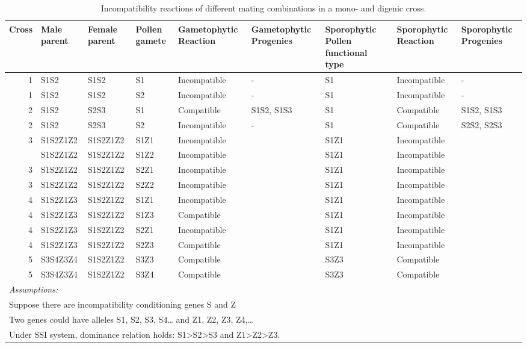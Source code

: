 \documentclass[11pt,ignorenonframetext,aspectratio=169]{beamer}
\begin{document}
\begin{frame}{}
\protect\hypertarget{section-5}{}
\begin{table}

\caption{\label{tab:si-comparison-reaction1}Incompatibility reactions of different mating combinations in a mono- and digenic cross.}
\centering
\fontsize{6}{8}\selectfont
\begin{tabular}[t]{r>{\raggedright\arraybackslash}p{4em}>{\raggedright\arraybackslash}p{4em}>{\raggedright\arraybackslash}p{4em}>{\raggedright\arraybackslash}p{6em}>{\raggedright\arraybackslash}p{8em}>{\raggedright\arraybackslash}p{8em}>{\raggedright\arraybackslash}p{6em}>{\raggedright\arraybackslash}p{8em}}
\toprule
Cross & Male parent & Female parent & Pollen gamete & Gametophytic Reaction & Gametophytic Progenies & Sporophytic Pollen functional type & Sporophytic Reaction & Sporophytic Progenies\\
\midrule
\rowcolor{gray!6}  1 & S1S2 & S1S2 & S1 & Incompatible & - & S1 & Incompatible & -\\
1 & S1S2 & S1S2 & S2 & Incompatible & - & S1 & Incompatible & -\\
\rowcolor{gray!6}  2 & S1S2 & S2S3 & S1 & Compatible & S1S2, S1S3 & S1 & Compatible & S1S2, S1S3\\
2 & S1S2 & S2S3 & S2 & Incompatible & - & S1 & Compatible & S2S2, S2S3\\
\rowcolor{gray!6}  3 & S1S2Z1Z2 & S1S2Z1Z2 & S1Z1 & Incompatible &  & S1Z1 & Incompatible & \\
\addlinespace
3 & S1S2Z1Z2 & S1S2Z1Z2 & S1Z2 & Incompatible &  & S1Z1 & Incompatible & \\
\rowcolor{gray!6}  3 & S1S2Z1Z2 & S1S2Z1Z2 & S2Z1 & Incompatible &  & S1Z1 & Incompatible & \\
3 & S1S2Z1Z2 & S1S2Z1Z2 & S2Z2 & Incompatible &  & S1Z1 & Incompatible & \\
\rowcolor{gray!6}  4 & S1S2Z1Z3 & S1S2Z1Z2 & S1Z1 & Incompatible &  & S1Z1 & Incompatible & \\
4 & S1S2Z1Z3 & S1S2Z1Z2 & S1Z3 & Compatible &  & S1Z1 & Incompatible & \\
\addlinespace
\rowcolor{gray!6}  4 & S1S2Z1Z3 & S1S2Z1Z2 & S2Z1 & Incompatible &  & S1Z1 & Incompatible & \\
4 & S1S2Z1Z3 & S1S2Z1Z2 & S2Z3 & Compatible &  & S1Z1 & Incompatible & \\
\rowcolor{gray!6}  5 & S3S4Z3Z4 & S1S2Z1Z2 & S3Z3 & Compatible &  & S3Z3 & Compatible & \\
5 & S3S4Z3Z4 & S1S2Z1Z2 & S3Z4 & Compatible &  & S3Z3 & Compatible & \\
\bottomrule
\multicolumn{9}{l}{\textit{Assumptions:}}\\
\multicolumn{9}{l}{Suppose there are incompatibility conditioning genes S and Z}\\
\multicolumn{9}{l}{Two genes could have alleles S1, S2, S3, S4… and Z1, Z2, Z3, Z4,…}\\
\multicolumn{9}{l}{Under SSI system, dominance relation holds: S1>S2>S3 and Z1>Z2>Z3.}\\
\end{tabular}
\end{table}
\end{frame}
\end{document}
